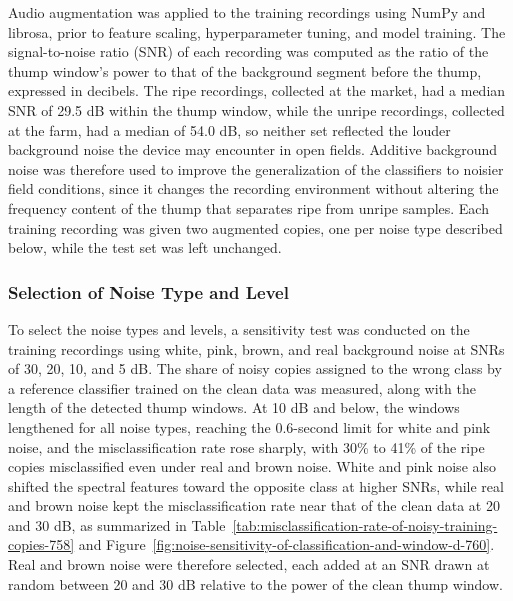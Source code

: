 \begin{thesisprose}
Audio augmentation was applied to the training recordings using NumPy and librosa, prior to feature scaling, hyperparameter tuning, and model training. The signal-to-noise ratio (SNR) of each recording was computed as the ratio of the thump window’s power to that of the background segment before the thump, expressed in decibels. The ripe recordings, collected at the market, had a median SNR of 29.5 dB within the thump window, while the unripe recordings, collected at the farm, had a median of 54.0 dB, so neither set reflected the louder background noise the device may encounter in open fields. Additive background noise was therefore used to improve the generalization of the classifiers to noisier field conditions, since it changes the recording environment without altering the frequency content of the thump that separates ripe from unripe samples. Each training recording was given two augmented copies, one per noise type described below, while the test set was left unchanged.

\subsubsection*{Selection of Noise Type and Level}

To select the noise types and levels, a sensitivity test was conducted on the training recordings using white, pink, brown, and real background noise at SNRs of 30, 20, 10, and 5 dB. The share of noisy copies assigned to the wrong class by a reference classifier trained on the clean data was measured, along with the length of the detected thump windows. At 10 dB and below, the windows lengthened for all noise types, reaching the 0.6-second limit for white and pink noise, and the misclassification rate rose sharply, with 30\% to 41\% of the ripe copies misclassified even under real and brown noise. White and pink noise also shifted the spectral features toward the opposite class at higher SNRs, while real and brown noise kept the misclassification rate near that of the clean data at 20 and 30 dB, as summarized in Table~\ref{tab:misclassification-rate-of-noisy-training-copies-758} and Figure~\ref{fig:noise-sensitivity-of-classification-and-window-d-760}. Real and brown noise were therefore selected, each added at an SNR drawn at random between 20 and 30 dB relative to the power of the clean thump window.


\end{thesisprose}
